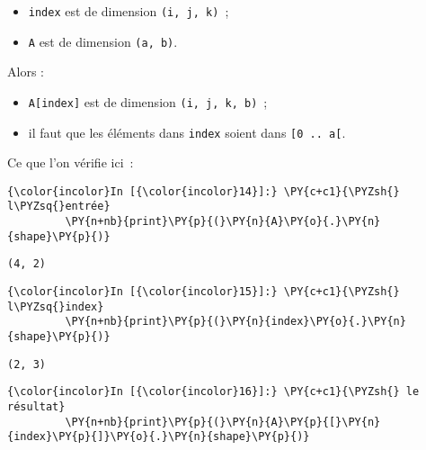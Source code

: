 \begin{itemize}
\tightlist
\item
  \texttt{index} est de dimension \texttt{(i,\ j,\ k)}~;
\item
  \texttt{A} est de dimension \texttt{(a,\ b)}.
\end{itemize}

Alors :

\begin{itemize}
\tightlist
\item
  \texttt{A{[}index{]}} est de dimension \texttt{(i,\ j,\ k,\ b)}~;
\item
  il faut que les éléments dans \texttt{index} soient dans
  \texttt{{[}0\ ..\ a{[}}.
\end{itemize}

    Ce que l'on vérifie ici~:

    \begin{Verbatim}[commandchars=\\\{\},frame=single,framerule=0.3mm,rulecolor=\color{cellframecolor}]
{\color{incolor}In [{\color{incolor}14}]:} \PY{c+c1}{\PYZsh{} l\PYZsq{}entrée}
         \PY{n+nb}{print}\PY{p}{(}\PY{n}{A}\PY{o}{.}\PY{n}{shape}\PY{p}{)}
\end{Verbatim}


    \begin{Verbatim}[commandchars=\\\{\},frame=single,framerule=0.3mm,rulecolor=\color{cellframecolor}]
(4, 2)
\end{Verbatim}

    \begin{Verbatim}[commandchars=\\\{\},frame=single,framerule=0.3mm,rulecolor=\color{cellframecolor}]
{\color{incolor}In [{\color{incolor}15}]:} \PY{c+c1}{\PYZsh{} l\PYZsq{}index}
         \PY{n+nb}{print}\PY{p}{(}\PY{n}{index}\PY{o}{.}\PY{n}{shape}\PY{p}{)}
\end{Verbatim}


    \begin{Verbatim}[commandchars=\\\{\},frame=single,framerule=0.3mm,rulecolor=\color{cellframecolor}]
(2, 3)
\end{Verbatim}

    \begin{Verbatim}[commandchars=\\\{\},frame=single,framerule=0.3mm,rulecolor=\color{cellframecolor}]
{\color{incolor}In [{\color{incolor}16}]:} \PY{c+c1}{\PYZsh{} le résultat}
         \PY{n+nb}{print}\PY{p}{(}\PY{n}{A}\PY{p}{[}\PY{n}{index}\PY{p}{]}\PY{o}{.}\PY{n}{shape}\PY{p}{)}
\end{Verbatim}


